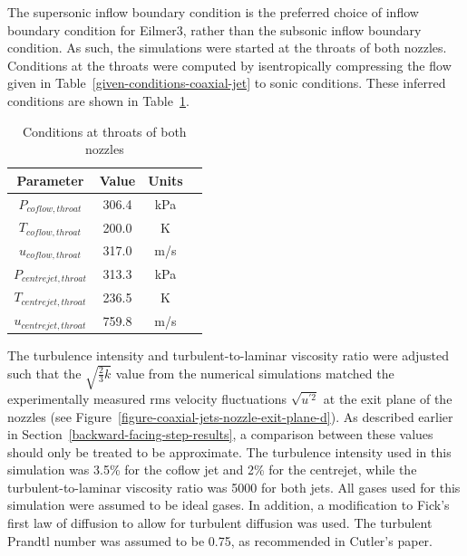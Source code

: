 %
The supersonic inflow boundary condition is the preferred choice 
of inflow boundary condition for Eilmer3, rather than the subsonic 
inflow boundary condition. As such, the simulations
were started at the throats of both nozzles. Conditions at the throats
were computed by isentropically compressing the flow given in
Table~\ref{given-conditions-coaxial-jet} to sonic conditions. These inferred
conditions are shown in Table~\ref{inferred-conditions-coaxial-jet}.
%
\begin{table}[h]
  \caption{Conditions at throats of both nozzles}
  \label{inferred-conditions-coaxial-jet}
  \begin{center}
    \begin{tabular}{cccl}
      \hline\hline
      Parameter & Value   & Units \\
      \hline
      $P_{coflow,throat}$     & 306.4   & kPa \\
      $T_{coflow,throat}$     & 200.0   & K   \\
      $u_{coflow,throat}$     & 317.0   & m/s \\
      $P_{centrejet,throat}$  & 313.3   & kPa \\
      $T_{centrejet,throat}$  & 236.5   & K   \\
      $u_{centrejet,throat}$  & 759.8   & m/s \\
      \hline \hline
    \end{tabular}
  \end{center}
\end{table}
%
The turbulence intensity and turbulent-to-laminar viscosity ratio were adjusted
such that the $\sqrt{\frac{2}{3}k}$ value from the numerical simulations matched
the experimentally measured rms velocity fluctuations $\sqrt{u^{'2}}$ at the exit plane of
the nozzles (see Figure~\ref{figure-coaxial-jets-nozzle-exit-plane-d}). As described
earlier in Section~\ref{backward-facing-step-results}, a comparison between these 
values should only be treated to be approximate. The turbulence intensity used in 
this simulation was 3.5\% for the coflow jet and 2\% for the centrejet, while the 
turbulent-to-laminar viscosity ratio was 5000 for both jets. All gases used for 
this simulation were assumed to be ideal gases. In addition, a modification to 
Fick's first law of diffusion to allow for turbulent diffusion was used. The 
turbulent Prandtl number was assumed to be 0.75, as recommended in Cutler's paper.


%


